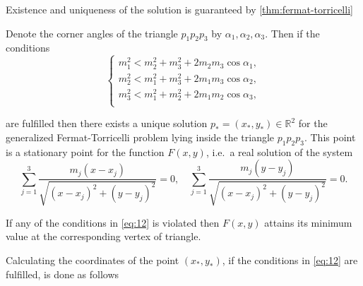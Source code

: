 Existence and uniqueness of the solution is guaranteed by
\cref{thm:fermat-torricelli}
%
\begin{theorem}
\label{thm:fermat-torricelli}
  Denote the corner angles of the triangle $p_1 p_2 p_3$ by $\alpha_1, \alpha_2,
  \alpha_3$. Then if the conditions
  \begin{equation}
    \label{eq:12}
    \left\{
      \begin{array}{c}
        m_1^2 < m_2^2 + m_3^2 + 2 m_2 m_3 \cos \alpha_1 , \\
        m_2^2 < m_1^2 + m_3^2 + 2 m_1 m_3 \cos \alpha_2 , \\
        m_3^2 < m_1^2 + m_2^2 + 2 m_1 m_2 \cos \alpha_3 , \\
      \end{array}
    \right.
  \end{equation}


  are fulfilled then there exists a unique solution $p_\ast = (x_\ast, y_\ast)
  \in \mathbb{R}^2$ for the generalized Fermat-Torricelli problem lying inside
  the triangle $p_1 p_2 p_3$. This point is a stationary point for the function
  $F(x,y)$, i.e.\ a real solution of the system
  \begin{equation}
    \label{eq:13}
    \sum_{j=1}^3 \frac{m_j(x-x_j)}{\sqrt{{(x-x_j)}^2 + {(y - y_j)}^2}} = 0, \quad
    \sum_{j=1}^3 \frac{m_j(y-y_j)}{\sqrt{{(x-x_j)}^2 + {(y - y_j)}^2}} = 0.
  \end{equation}


  If any of the conditions in \cref{eq:12} is violated then $F(x,y)$ attains its
  minimum value at the corresponding vertex of triangle.
\end{theorem}
%
Calculating the coordinates of the point $(x_\ast, y_\ast)$, if the conditions
in \cref{eq:12} are fulfilled, is done as follows
